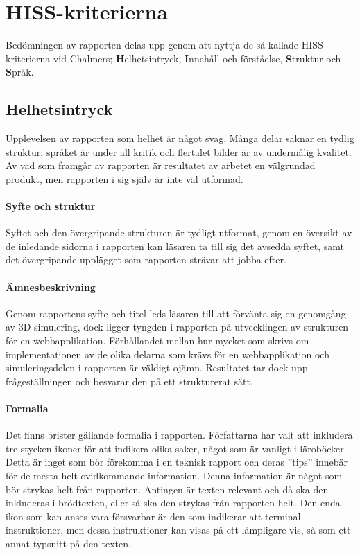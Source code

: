 \section{HISS-kriterierna} %
\label{sec:hiss}
    Bedömningen av rapporten delas upp genom att nyttja de så kallade HISS-kriterierna vid Chalmers; \textbf{H}elhetsintryck, \textbf{I}nnehåll och förståelse, \textbf{S}truktur och \textbf{S}pråk.

    \subsection{Helhetsintryck} %
    \label{sub:helhetsintryck}
        Upplevelsen av rapporten som helhet är något svag. Många delar saknar en tydlig struktur, språket är under all kritik och flertalet bilder är av undermålig kvalitet. Av vad som framgår av rapporten är resultatet av arbetet en välgrundad produkt, men rapporten i sig själv är inte väl utformad.

        \paragraph{Syfte och struktur}
            Syftet och den övergripande strukturen är tydligt utformat, genom en översikt av de inledande sidorna i rapporten kan läsaren ta till sig det avsedda syftet, samt det övergripande upplägget som rapporten strävar att jobba efter.

        \paragraph{Ämnesbeskrivning}
            Genom rapportens syfte och titel leds läsaren till att förvänta sig en genomgång av 3D-simulering, dock ligger tyngden i rapporten på utvecklingen av strukturen för en webbapplikation. Förhållandet mellan hur mycket som skrivs om implementationen av de olika delarna som krävs för en webbapplikation och simuleringsdelen i rapporten är väldigt ojämn. Resultatet tar dock upp frågeställningen och besvarar den på ett strukturerat sätt.

        \paragraph{Formalia}
            Det finns brister gällande formalia i rapporten. Författarna har valt att inkludera tre stycken ikoner för att indikera olika saker, något som är vanligt i läroböcker. Detta är inget som bör förekomma i en teknisk rapport och deras ''tips'' innebär för de mesta helt ovidkommande information. Denna information är något som bör strykas helt från rapporten. Antingen är texten relevant och då ska den inkluderas i brödtexten, eller så ska den strykas från rapporten helt. Den enda ikon som kan anses vara försvarbar är den som indikerar att terminal instruktioner, men dessa instruktioner kan visas på ett lämpligare vis, så som ett annat typsnitt på den texten.

